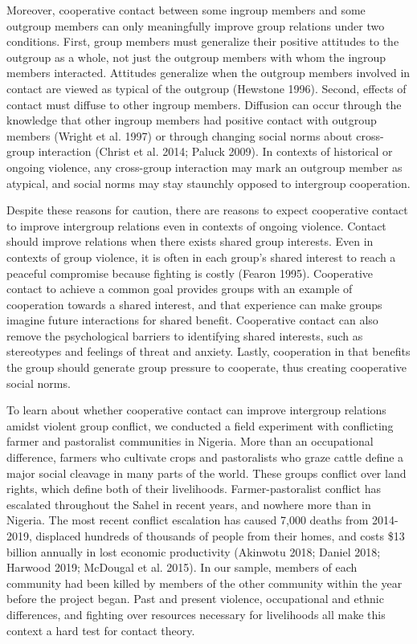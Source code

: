 \documentclass[11pt]{article}
\begin{document}
Moreover, cooperative contact between some ingroup members and some
outgroup members can only meaningfully improve group relations under two
conditions. First, group members must generalize their positive
attitudes to the outgroup as a whole, not just the outgroup members with
whom the ingroup members interacted. Attitudes generalize when the
outgroup members involved in contact are viewed as typical of the
outgroup (Hewstone 1996). Second, effects of contact must diffuse to
other ingroup members. Diffusion can occur through the knowledge that
other ingroup members had positive contact with outgroup members (Wright
et al. 1997) or through changing social norms about cross-group
interaction (Christ et al. 2014; Paluck 2009). In contexts of historical
or ongoing violence, any cross-group interaction may mark an outgroup
member as atypical, and social norms may stay staunchly opposed to
intergroup cooperation.

Despite these reasons for caution, there are reasons to expect
cooperative contact to improve intergroup relations even in contexts of
ongoing violence. Contact should improve relations when there exists
shared group interests. Even in contexts of group violence, it is often
in each group's shared interest to reach a peaceful compromise because
fighting is costly (Fearon 1995). Cooperative contact to achieve a
common goal provides groups with an example of cooperation towards a
shared interest, and that experience can make groups imagine future
interactions for shared benefit. Cooperative contact can also remove the
psychological barriers to identifying shared interests, such as
stereotypes and feelings of threat and anxiety. Lastly, cooperation in
that benefits the group should generate group pressure to cooperate,
thus creating cooperative social norms.

To learn about whether cooperative contact can improve intergroup
relations amidst violent group conflict, we conducted a field experiment
with conflicting farmer and pastoralist communities in Nigeria. More
than an occupational difference, farmers who cultivate crops and
pastoralists who graze cattle define a major social cleavage in many
parts of the world. These groups conflict over land rights, which define
both of their livelihoods. Farmer-pastoralist conflict has escalated
throughout the Sahel in recent years, and nowhere more than in Nigeria.
The most recent conflict escalation has caused 7,000 deaths from
2014-2019, displaced hundreds of thousands of people from their homes,
and costs \$13 billion annually in lost economic productivity (Akinwotu
2018; Daniel 2018; Harwood 2019; McDougal et al. 2015). In our sample,
members of each community had been killed by members of the other
community within the year before the project began. Past and present
violence, occupational and ethnic differences, and fighting over
resources necessary for livelihoods all make this context a hard test
for contact theory.
\end{document}

